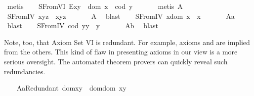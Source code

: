 \begin{isabellebody}
\ metis%
\endisatagproof
{\isafoldproof}%
%
\isadelimproof
\isanewline
%
\endisadelimproof
\ \ \isamarkupfalse%
\ S{}FromVI{\isacharcolon}\ {\isachardoublequoteopen}E{\isacharparenleft}x{\isasymcdot}y{\isacharparenright}\ \isactrlbold {\isasymleftrightarrow}\ dom\ x\ {\isasymsimeq}\ cod\ y{\isachardoublequoteclose}\ \isanewline
%
\isadelimproof
\ \ \ \ %
\endisadelimproof
%
\isatagproof
{}\isamarkupfalse%
\ {\isacharparenleft}metis\ A{}{\isacharparenright}%
\endisatagproof
{\isafoldproof}%
%
\isadelimproof
\isanewline
%
\endisadelimproof
\ \ \isamarkupfalse%
\ S{}FromIV{\isacharcolon}\ {\isachardoublequoteopen}x{\isasymcdot}{\isacharparenleft}y{\isasymcdot}z{\isacharparenright}\ {\isasymcong}\ {\isacharparenleft}x{\isasymcdot}y{\isacharparenright}{\isasymcdot}z{\isachardoublequoteclose}\ \isanewline
%
\isadelimproof
\ \ \ \ %
\endisadelimproof
%
\isatagproof
{}\isamarkupfalse%
\ A{}\ \isamarkupfalse%
\ blast%
\endisatagproof
{\isafoldproof}%
%
\isadelimproof
\isanewline
%
\endisadelimproof
\ \ \isamarkupfalse%
\ S{}FromIV{\isacharcolon}\ {\isachardoublequoteopen}x{\isasymcdot}{\isacharparenleft}dom\ x{\isacharparenright}\ {\isasymcong}\ x{\isachardoublequoteclose}\ \isanewline
%
\isadelimproof
\ \ \ \ %
\endisadelimproof
%
\isatagproof
{}\isamarkupfalse%
\ A{}a\ \isamarkupfalse%
\ blast%
\endisatagproof
{\isafoldproof}%
%
\isadelimproof
\isanewline
%
\endisadelimproof
\ \ \isamarkupfalse%
\ S{}FromIV{\isacharcolon}\ {\isachardoublequoteopen}{\isacharparenleft}cod\ y{\isacharparenright}{\isasymcdot}y\ {\isasymcong}\ y{\isachardoublequoteclose}\ \isanewline
%
\isadelimproof
\ \ \ \ %
\endisadelimproof
%
\isatagproof
{}\isamarkupfalse%
\ A{}b\ \isamarkupfalse%
\ blast%
\endisatagproof
{\isafoldproof}%
%
\isadelimproof
%
\endisadelimproof
%
\begin{isamarkuptext}%
Note, too, that Axiom Set VI is redundant. For example, axioms  and  are
  implied from the others. This kind of flaw in presenting axioms in our view is a more serious oversight.
  The automated theorem provers can quickly reveal such redundancies.%
\end{isamarkuptext}\isamarkuptrue%
\ \ \isamarkupfalse%
\ A{}aRedundant{\isacharcolon}\ {\isachardoublequoteopen}dom{\isacharparenleft}x{\isasymcdot}y{\isacharparenright}\ {\isasymcong}\ dom{\isacharparenleft}{\isacharparenleft}dom\ x{\isacharparenright}{\isasymcdot}y{\isacharparenright}{\isachardoublequoteclose}\ \isanewline

\end{isabellebody}
